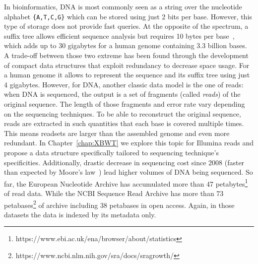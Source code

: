 In bioinformatics, DNA is most commonly seen as a string over the nucleotide alphabet \texttt{\{A,T,C,G\}} which can be stored using just 2 bits per base. However, this type of storage does not provide fast queries. At the opposite of the spectrum, a suffix tree allows efficient sequence analysis but requires 10 bytes per base~\cite{navarro2016compact}, which adds up to 30 gigabytes for a human genome containing 3.3 billion bases. A trade-off between those two extreme has been found through the development of compact data structures that exploit redundancy to decrease space usage. For a human genome it allows to represent the sequence and its suffix tree using just 4 gigabytes. 
However, for DNA, another classic data model is the one of reads: when DNA is sequenced, the output is a set of fragments (called \emph{reads}) of the original sequence. The length of those fragments and error rate vary depending on the sequencing techniques. To be able to reconstruct the original sequence, reads are extracted in such quantities that each base is covered multiple times. This means readsets are larger than the assembled genome and even more redundant. In Chapter~\ref{chap:XBWT} we explore this topic for Illumina reads and propose a data structure specifically tailored to sequencing technique's specificities. 
Additionally, drastic decrease in sequencing cost since 2008 (faster than expected by Moore's law~\cite{muir2016real}) lead higher volumes of DNA being sequenced. 
So far, the European Nucleotide Archive has accumulated more than 47 petabytes\footnote{https://www.ebi.ac.uk/ena/browser/about/statistics} of read data.
While the NCBI Sequence Read Archive has more than 73 petabases\footnote{https://www.ncbi.nlm.nih.gov/sra/docs/sragrowth/} of archive including 38 petabases in open access. Again, in those datasets the data is indexed by its metadata only.

